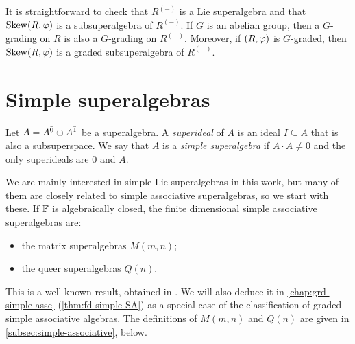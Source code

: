It is straightforward to check that $R^{(-)}$ is a Lie superalgebra and that $\operatorname{Skew}(R, \varphi)$ is a subsuperalgebra of $R^{(-)}$. 
If $G$ is an abelian group, then a $G$-grading on $R$ is also a $G$-grading on $R^{(-)}$. 
Moreover, if $(R, \varphi)$ is $G$-graded, then $\operatorname{Skew} (R, \varphi)$ is a graded subsuperalgebra of $R^{(-)}$. 

\section{Simple superalgebras}\label{sec:simple-algebras}

\begin{defi}
    Let $A = A^{\bar0} \oplus A^{\bar1}$ be a superalgebra. 
    A \emph{superideal} of $A$ is an ideal $I \subseteq A$ that is also a subsuperspace. 
    We say that $A$ is a  \emph{simple superalgebra} if $A\cdot A \neq 0$ and the only superideals are $0$ and $A$.
\end{defi}




We are mainly interested in simple Lie superalgebras in this work, but many of them are closely related to simple associative superalgebras, so we start with these. 
If $\mathbb{F}$ is algebraically closed, the finite dimensional simple associative superalgebras are:
%
\begin{itemize}
    \item the matrix superalgebras $M(m,n)$;
    
    \item the queer superalgebras $Q(n)$.
\end{itemize}

This is a well known result, obtained in \cite{MR167498}. 
We will also deduce it in \cref{chap:grd-simple-assc} (\cref{thm:fd-simple-SA}) as a special case of the classification of graded-simple associative algebras. 
The definitions of $M(m, n)$ and $Q(n)$ are given in \cref{subsec:simple-associative}, below. 

